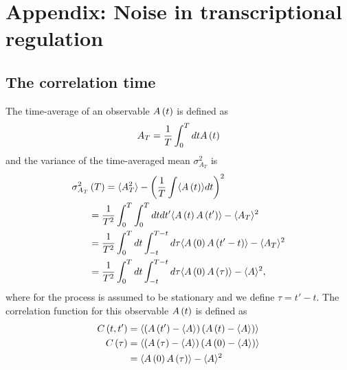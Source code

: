 
\section{Appendix: Noise in transcriptional regulation}

\subsection{ The correlation time}
The time-average of an observable $A\left ( t\right )$\cite{Frenkel2002} is defined as
\begin{align}
\elabel{si:time_av_mean}
A_T=\frac{1}{T}\int_0^T dt A\br{t}
\end{align}
and the variance of the time-averaged mean $\sigma^2_{A_T}$ is
\begin{align}
\sigma^2_{A_T}&\br{T}=\avg{A^2_T}-\br{\frac{1}{T}\int \avg{A\br{t}}dt}^2\\
&=\frac{1}{T^2}\int_0^T  \int_0^T dt dt' \avg{A\br{t}A\br{t'}}-\avg{A_T}^2\\
\elabel{si:time_av_var2}
&=\frac{1}{T^2}\int_0^T dt \int_{-t}^{T-t} d\tau \avg{A\br{0}A\br{t'-t}}-\avg{A_T}^2\\
\elabel{si:time_av_var3}
&=\frac{1}{T^2}\int_0^T dt\int_{-t}^{T-t} d\tau \avg{A\br{0}A\br{\tau}}-\avg{A}^2,
\end{align}
where for  the process is assumed to be stationary and we define $\tau=t'-t$.
The correlation function for this observable $A\left ( t\right )$ is defined as
\begin{align}
\elabel{si:time_corr_ens}
C\br{t,t'}&=\avg{\br{A\br{t'}-\avg{A}}\br{A\br{t}-\avg{A}}}\\
\elabel{si:time_corr_ens_1}
C\br{\tau}&=\avg{\br{A\br{\tau}-\avg{A}}\br{A\br{0}-\avg{A}}}\\
\elabel{si:time_corr_ens_2}
&=\avg{A\br{0}A\br{\tau}}-\avg{A}^2
\end{align}

